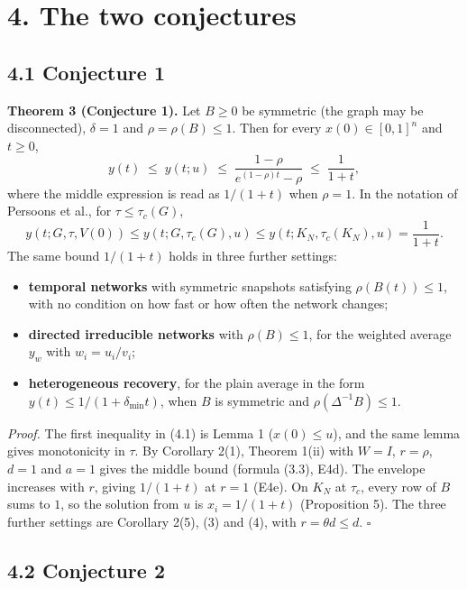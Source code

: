 \documentclass[
  11pt,
  a4paper,
]{article}
\providecommand{\tightlist}{%
  \setlength{\itemsep}{0pt}\setlength{\parskip}{0pt}}
\begin{document}
\section{4. The two conjectures}\label{the-two-conjectures}

\subsection{4.1 Conjecture 1}\label{conjecture-1}

\textbf{Theorem 3 (Conjecture 1).} Let \(B\ge0\) be symmetric (the graph
may be disconnected), \(\delta=1\) and \(\rho=\rho(B)\le1\). Then for
every \(x(0)\in[0,1]^n\) and \(t\ge0\), \[
y(t)\;\le\;y(t;u)\;\le\;\frac{1-\rho}{e^{(1-\rho)t}-\rho}\;\le\;\frac{1}{1+t}, \tag{4.1}
\] where the middle expression is read as \(1/(1+t)\) when \(\rho=1\).
In the notation of Persoons et al., for \(\tau\le\tau_c(G)\),
\[y(t;G,\tau,V(0))\le y(t;G,\tau_c(G),u)\le y(t;K_N,\tau_c(K_N),u)=\frac1{1+t}.\]
The same bound \(1/(1+t)\) holds in three further settings:

\begin{itemize}
\tightlist
\item
  \textbf{temporal networks} with symmetric snapshots satisfying
  \(\rho(B(t))\le1\), with no condition on how fast or how often the
  network changes;
\item
  \textbf{directed irreducible networks} with \(\rho(B)\le1\), for the
  weighted average \(y_w\) with \(w_i=u_i/v_i\);
\item
  \textbf{heterogeneous recovery}, for the plain average in the form
  \(y(t)\le1/(1+\delta_{\min}t)\), when \(B\) is symmetric and
  \(\rho(\Delta^{-1}B)\le1\).
\end{itemize}

\emph{Proof.} The first inequality in (4.1) is Lemma 1 (\(x(0)\le u\)),
and the same lemma gives monotonicity in \(\tau\). By Corollary 2(1),
Theorem 1(ii) with \(W=I\), \(r=\rho\), \(d=1\) and \(a=1\) gives the
middle bound (formula (3.3), E4d). The envelope increases with \(r\),
giving \(1/(1+t)\) at \(r=1\) (E4e). On \(K_N\) at \(\tau_c\), every row
of \(B\) sums to \(1\), so the solution from \(u\) is \(x_i=1/(1+t)\)
(Proposition 5). The three further settings are Corollary 2(5), (3) and
(4), with \(r=\theta d\le d\). \(\square\)

\subsection{4.2 Conjecture 2}\label{conjecture-2}
\end{document}
